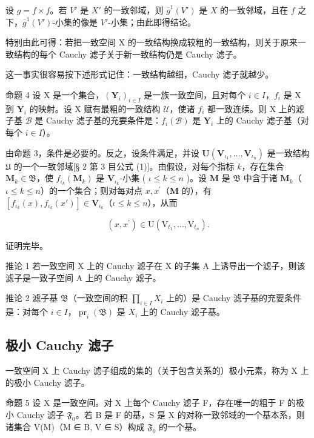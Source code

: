 设 \(g = f \times f\)。若 \(V'\) 是 \(X'\) 的一致邻域，则 \(\overline{g}^1(V')\) 是 \(X\) 的一致邻域，且在 \(f\) 之下，\(\overline{g}^1(V')\)-小集的像是 \(V'\)-小集；由此即得结论。

特别由此可得：若把一致空间 X 的一致结构换成较粗的一致结构，则关于原来一致结构的每个 Cauchy 滤子关于新一致结构仍是 Cauchy 滤子。

这一事实很容易按下述形式记住：一致结构越细，Cauchy 滤子就越少。

命题 4 设 X 是一个集合，\((\mathbf{Y}_i)_{i\in I}\) 是一族一致空间，且对每个 \(i\in I\)，\(f_i\) 是 X 到 \(\mathbf{Y}_i\) 的映射。设 X 赋有最粗的一致结构 \(\mathcal{U}\)，使诸 \(f_i\) 都一致连续。则 X 上的滤子基 \(\mathcal{B}\) 是 Cauchy 滤子基的充要条件是：\(f_i(\mathcal{B})\) 是 \(\mathbf{Y}_i\) 上的 Cauchy 滤子基（对每个 \(i\in I\)）。

由命题 3，条件是必要的。反之，设条件满足，并设 \(\mathbf{U}(\mathbf{V}_{\iota_1},\ldots ,\mathbf{V}_{\iota_n})\) 是一致结构 \(\mathfrak{U}\) 的一个一致邻域{[}§ 2 第 3 目公式 (1){]}。由假设，对每个指标 \(k\)，存在集合 \(\mathbf{M}_k\in \mathfrak{B}\)，使 \(f_{\iota_k}(\mathbf{M}_k)\) 是 \(\mathbf{V}_{\iota_k}\)-小集 ( \(\iota \leqslant k\leqslant n\) )。设 \(\mathbf{M}\) 是 \(\mathfrak{B}\) 中含于诸 \(\mathbf{M}_k\)（\(\iota \leqslant k\leqslant n\)）的一个集合；则对每对点 \(x,x^{\prime}\)（\(\mathbf{M}\) 的），有 \([f_{\iota_k}(x),f_{\iota_k}(x')]\in \mathbf{V}_{\iota_k}\)（\(\iota \leqslant k\leqslant n\)），从而

\[
(x, x ^ {\prime}) \in \mathrm{U} (\mathrm{V} _ {t _ {1}}, \dots , \mathrm{V} _ {t _ {n}}).
\]

证明完毕。

推论 1 若一致空间 X 上的 Cauchy 滤子在 X 的子集 A 上诱导出一个滤子，则该滤子是一致子空间 A 上的 Cauchy 滤子。

推论 2 滤子基 \(\mathfrak{B}\)（一致空间的积 \(\prod_{i\in I}X_i\) 上的）是 Cauchy 滤子基的充要条件是：对每个 \(i\in I\)，\(\operatorname{pr}_i(\mathfrak{B})\) 是 \(X_i\) 上的 Cauchy 滤子基。

\subsection{极小 Cauchy 滤子}

一致空间 X 上 Cauchy 滤子组成的集的（关于包含关系的）极小元素，称为 X 上的极小 Cauchy 滤子。

命题 5 设 X 是一致空间。对 X 上每个 Cauchy 滤子 F，存在唯一的粗于 F 的极小 Cauchy 滤子 \(\mathfrak{F}_0\)。若 B 是 F 的基，S 是 X 的对称一致邻域的一个基本系，则诸集合 V(M)（M ∈ B, V ∈ S）构成 \(\mathfrak{F}_0\) 的一个基。


